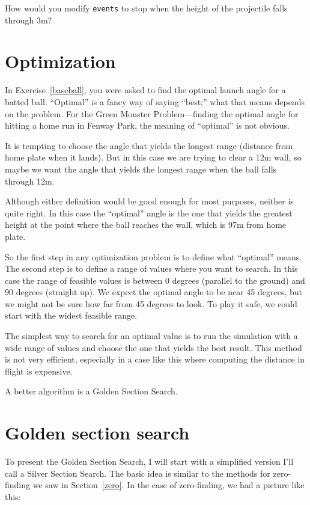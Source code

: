 \documentclass{book}
\begin{document}
\begin{ex}
How would you modify {\tt events} to stop when the height of
the projectile falls through 3m?
\end{ex}


\section{Optimization}

In Exercise~\ref{baseball}, you were asked to find the optimal
launch angle for a batted ball. ``Optimal'' is a fancy way of
saying ``best;'' what that means depends on the problem. For
the Green Monster Problem---finding the optimal angle for
hitting a home run in Fenway Park, the meaning of ``optimal''
is not obvious.

It is tempting to choose the angle that yields the longest
range (distance from home plate when it lands). But in this
case we are trying to clear a 12m wall, so maybe we want
the angle that yields the longest range when the ball falls
through 12m.

Although either definition would be good enough for most purposes,
neither is quite right. In this case the ``optimal'' angle is
the one that yields the greatest height at the point where
the ball reaches the wall, which is 97m from home plate.

So the first step in any optimization problem is to define
what ``optimal'' means. The second step is to define a range of
values where you want to search. In this case the range of
feasible values is between 0 degrees (parallel to the ground)
and 90 degrees (straight up). We expect the
optimal angle to be near 45 degrees, but we might not be sure
how far from 45 degrees to look. To play it safe, we could
start with the widest feasible range.

The simplest way to search for an optimal value is to run the
simulation with a wide range of values and choose the one
that yields the best result. This
method is not very efficient, especially in a case like this where
computing the distance in flight is expensive.

A better algorithm is a Golden Section Search. 

\section{Golden section search}

To present the Golden Section Search, I will start with a simplified
version I'll call a Silver Section Search. The basic idea is similar to
the methods for zero-finding we saw in Section~\ref{zero}. In the
case of zero-finding, we had a picture like this:
\end{document}
